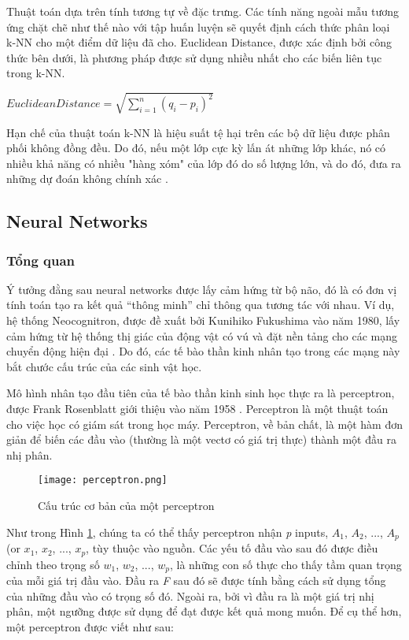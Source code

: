 Thuật toán dựa trên tính tương tự về đặc trưng. 
Các tính năng ngoài mẫu tương ứng chặt chẽ như thế nào với tập huấn luyện sẽ quyết định cách thức phân loại k-NN cho một điểm dữ liệu đã cho.
Euclidean Distance,  được xác định bởi công thức bên dưới, là phương pháp được sử dụng nhiều nhất cho các biến liên tục trong k-NN.

\begin{center}
$EuclideanDistance =  \sqrt{ \sum_{i=1}^{n}(q_i - p_i)^2 }$
\end{center}

Hạn chế của thuật toán k-NN là hiệu suất tệ hại trên các bộ dữ liệu được phân phối không đồng đều.
Do đó, nếu một lớp cực kỳ lấn át những lớp khác, nó có nhiều khả năng có nhiều "hàng xóm" của lớp đó do số lượng lớn, và do đó, đưa ra những dự đoán không chính xác \cite{laaksonen1996classification}.

\subsection{Neural Networks}

\subsubsection{Tổng quan}

Ý tưởng đằng sau neural networks được lấy cảm hứng từ bộ não, đó là có đơn vị tính toán tạo ra kết quả “thông minh” chỉ thông qua tương tác với nhau.
Ví dụ, hệ thống Neocognitron, được đề xuất bởi Kunihiko Fukushima vào năm 1980, lấy cảm hứng từ hệ thống thị giác của động vật có vú và đặt nền tảng cho các mạng chuyển động hiện đại \cite{goodfellow2016deep}. 
Do đó, các tế bào thần kinh nhân tạo trong các mạng này bắt chước cấu trúc của các sinh vật học.

Mô hình nhân tạo đầu tiên của tế bào thần kinh sinh học thực ra là perceptron, được Frank Rosenblatt giới thiệu vào năm 1958 \cite{rosenblatt1958perceptron}. 
Perceptron là một thuật toán cho việc học có giám sát trong học máy. 
Perceptron, về bản chất, là một hàm đơn giản để biến các đầu vào (thường là một vectơ có giá trị thực) thành một đầu ra nhị phân.

\begin{figure}[H] 
\centering    
\texttt{[image: perceptron.png]}
\caption{Cấu trúc cơ bản của một perceptron \cite{minsky1969perceptron}}
\label{fig:perceptron}
\end{figure}

Như trong Hình \ref{fig:perceptron}, chúng ta có thể thấy perceptron nhận \textit{p} inputs, $A_1$, $A_2$, ..., $A_p$ (or $x_1$, $x_2$, ..., $x_p$, tùy thuộc vào nguồn.
Các yếu tố đầu vào sau đó được điều chỉnh theo trọng số $w_1$, $w_2$, ..., $w_p$, là những con số thực cho thấy tầm quan trọng của mỗi giá trị đầu vào.
Đầu ra \textit{F} sau đó sẽ được tính bằng cách sử dụng tổng của những đầu vào có trọng số đó. 
Ngoài ra, bởi vì đầu ra là một giá trị nhị phân, một ngưỡng được sử dụng để đạt được kết quả mong muốn. Để cụ thể hơn, một perceptron được viết như sau:

